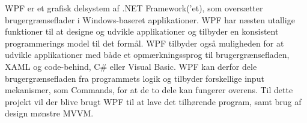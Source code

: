 WPF er et grafisk delsystem af .NET Framework(’et), som oversætter brugergrænseflader i Windows-baseret applikationer. WPF har næsten utallige funktioner til at designe og udvikle applikationer og tilbyder en konsistent programmerings model til det formål. WPF tilbyder også muligheden for at udvikle applikationer med både et opmærkningssprog til brugergrænsefladen, XAML og code-behind, C\# eller Visual Basic. WPF kan derfor dele brugergrænsefladen fra programmets logik og tilbyder forskellige input mekanismer, som Commands, for at de to dele kan fungerer overens. Til dette projekt vil der blive brugt WPF til at lave det tilhørende program, samt brug af design mønstre MVVM. \cite{msdn2}
